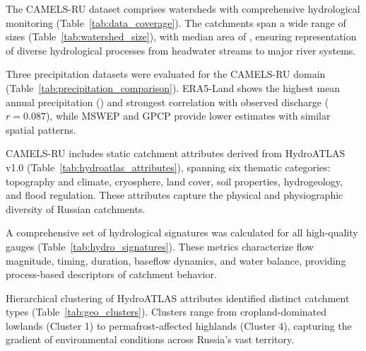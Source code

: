

The CAMELS-RU dataset comprises \ntotal watersheds with comprehensive hydrological monitoring 
(Table~\ref{tab:data_coverage}). The catchments span a wide range of sizes 
(Table~\ref{tab:watershed_size}), with median area of \medianarea, ensuring representation 
of diverse hydrological processes from headwater streams to major river systems.





Three precipitation datasets were evaluated for the CAMELS-RU domain (Table~\ref{tab:precipitation_comparison}). 
ERA5-Land shows the highest mean annual precipitation (\erafiveannual) and strongest correlation with 
observed discharge ($r = 0.087$), while MSWEP and GPCP provide lower estimates with similar spatial patterns.




CAMELS-RU includes \nattributes static catchment attributes derived from HydroATLAS v1.0 
(Table~\ref{tab:hydroatlas_attributes}), spanning six thematic categories: topography and climate, 
cryosphere, land cover, soil properties, hydrogeology, and flood regulation. These attributes 
capture the physical and physiographic diversity of Russian catchments.




A comprehensive set of hydrological signatures was calculated for all high-quality gauges 
(Table~\ref{tab:hydro_signatures}). These metrics characterize flow magnitude, timing, duration, 
baseflow dynamics, and water balance, providing process-based descriptors of catchment behavior.




Hierarchical clustering of HydroATLAS attributes identified \nclusters distinct catchment types 
(Table~\ref{tab:geo_clusters}). Clusters range from cropland-dominated lowlands (Cluster 1) to 
permafrost-affected highlands (Cluster 4), capturing the gradient of environmental conditions 
across Russia's vast territory.

